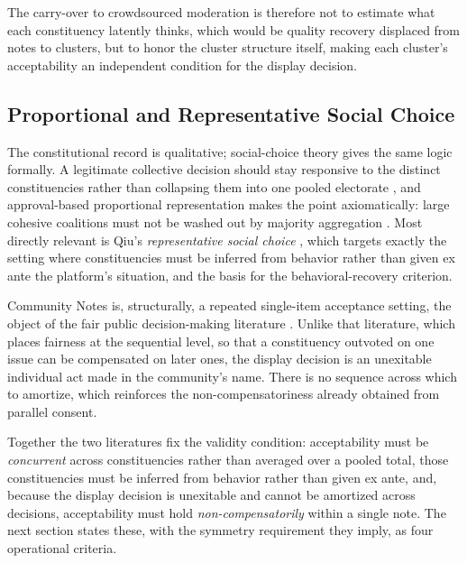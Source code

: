 \documentclass[10pt,twocolumn]{article}
\begin{document}
The carry-over to crowdsourced moderation is therefore not to estimate what each
constituency latently thinks, which would be quality recovery displaced from
notes to clusters, but to honor the cluster structure itself, making each
cluster's acceptability an independent condition for the display decision.

\subsection*{Proportional and Representative Social Choice}

The constitutional record is qualitative; social-choice theory gives the same
logic formally. A legitimate collective decision should stay responsive to the
distinct constituencies rather than collapsing them into one pooled electorate
\citep{peters2019proportionality,peters2021proportional}, and approval-based
proportional representation makes the point axiomatically: large cohesive
coalitions must not be washed out by majority aggregation
\citep{aziz2015justified,sanchez2017proportional}. Most directly relevant is
Qiu's \emph{representative social choice} \citep{qiu2025representative}, which
targets exactly the setting where constituencies must be inferred from behavior
rather than given ex ante \textemdash{} the platform's situation, and the basis
for the behavioral-recovery criterion.

Community Notes is, structurally, a repeated single-item acceptance setting, the
object of the fair public decision-making literature
\citep{conitzer2017fair,lackner2020perpetual,skowron2022proportional}. Unlike
that literature, which places fairness at the sequential level, so that a
constituency outvoted on one issue can be compensated on later ones, the display
decision is an unexitable individual act made in the community's name. There is
no sequence across which to amortize, which reinforces the non-compensatoriness
already obtained from parallel consent.

Together the two literatures fix the validity condition: acceptability must be
\emph{concurrent} across constituencies rather than averaged over a pooled
total, those constituencies must be inferred from behavior rather than given ex
ante, and, because the display decision is unexitable and cannot be amortized
across decisions, acceptability must hold \emph{non-compensatorily} within a
single note. The next section states these, with the symmetry requirement they
imply, as four operational criteria.
\end{document}
